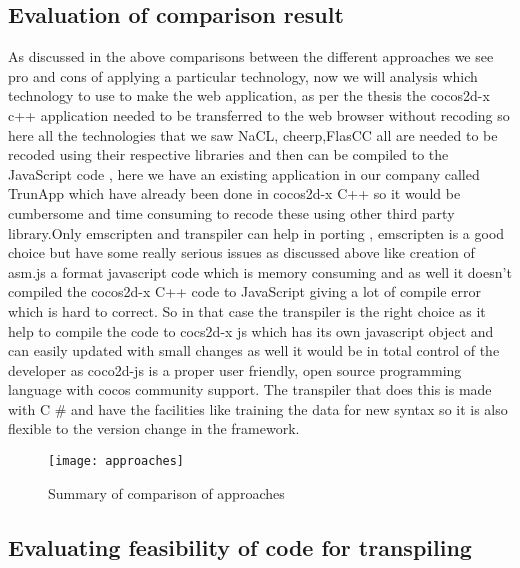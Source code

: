\documentclass[23pt]{article}
\begin{document}
\subsection{Evaluation of comparison result }

{\Large As discussed in the above comparisons between the different approaches we see pro and cons of applying a particular technology, now we will analysis which technology to use to make the web application, as per the thesis the cocos2d-x c++ application needed to be transferred to the web browser without recoding so here all the technologies that we saw NaCL, cheerp,FlasCC all are needed to be recoded using their respective libraries and then can be compiled to the JavaScript code , here we have an existing application in our company called TrunApp which have already been done in cocos2d-x C++ so it would be cumbersome and time consuming to recode these using other third party library.Only emscripten and transpiler can help in porting , emscripten is a good choice but have some really serious issues as discussed above like creation of asm.js a format javascript code which is memory consuming and as well it doesn’t compiled the cocos2d-x C++ code to JavaScript giving a lot of compile error which is hard to correct. So in that case the transpiler is the right choice as it help to compile the code to cocs2d-x js which has its own javascript object and can easily updated with small changes as well it would be in total control of the developer as coco2d-js is a proper user friendly, open source programming language with cocos community support. The transpiler that does this is made with C \# and have the facilities like training the data for new syntax so it is also flexible to the version change in the framework. \\ \par}

\begin{figure}[h]
\caption{Summary of comparison of approaches}
\centering
\texttt{[image: approaches]}
\end{figure}


\subsection{Evaluating feasibility of code for transpiling}
\end{document}
